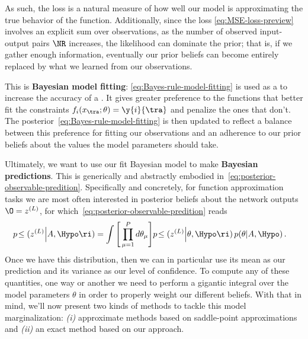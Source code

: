 As such, the loss is a natural measure of how well our model is approximating the true behavior of the function.
Additionally, since the loss \eqref{eq:MSE-loss-preview} involves an explicit sum over observations,
as the number of observed input-output pairs $\NR$  increases, the likelihood can dominate the prior; that is, if we gather enough information, eventually our prior beliefs  can become entirely replaced by what we learned from our observations. 












This is \textbf{Bayesian model fitting}: %
 \eqref{eq:Bayes-rule-model-fitting} is used
as a  to increase the accuracy of a . 
It gives greater preference to the functions that better fit  the constraints $f_i(x_{\tra};\theta)=\y{i}{\tra}$ and penalize the ones that don't.
The posterior~\eqref{eq:Bayes-rule-model-fitting} is then updated to reflect a balance between this preference for fitting our observations and an adherence to our prior beliefs about the values the model parameters should take.


Ultimately, we want to use our fit Bayesian model to make \textbf{Bayesian predictions}. This is generically and abstractly embodied in~\eqref{eq:posterior-observable-predition}. Specifically and concretely, for function approximation tasks we are most often interested in posterior beliefs about the network outputs $\O = z^{(L)}$, for which~\eqref{eq:posterior-observable-predition} reads
\begin{align}\label{eq:posterior-observable-predition-but-actually}
p\!\le(z^{(L)} \Big|A, \Hypo \ri)  &=\int \Bigg[\prod_{\mu=1}^{P} d \theta_{\mu}\Bigg] p\!\le(z^{(L)} \Big|\theta, \Hypo \ri)\, p(\theta|A, \Hypo) \, .
\end{align}
Once we have this distribution, then we can in particular use its mean as our prediction and its variance as our level of confidence.
To compute any of these quantities, one way or another we need to perform  a gigantic integral over the model parameters $\theta$ in order to properly weight our different beliefs.
With that in mind, we'll now present two kinds of methods to tackle this model marginalization: \emph{(i)} approximate methods based on saddle-point approximations and \emph{(ii)} an exact method based on our  approach.




